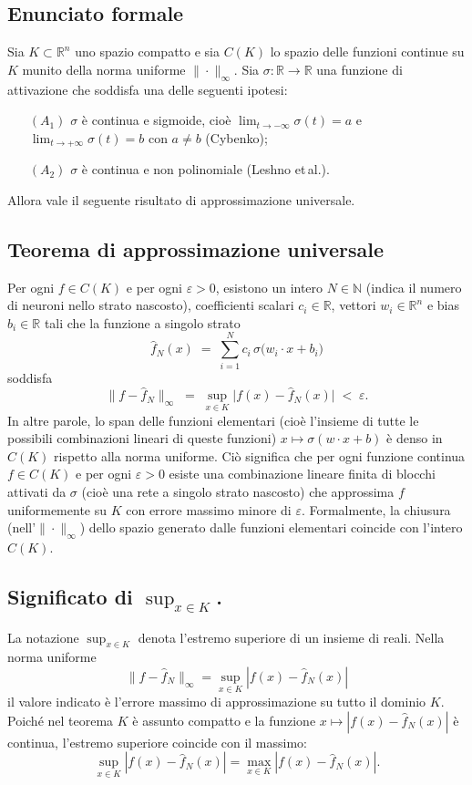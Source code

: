 \documentclass[a4paper,12pt]{report}
\begin{document}
	\subsection{Enunciato formale}
	Sia \(K\subset\mathbb{R}^n\) uno spazio compatto e sia \(C(K)\) lo spazio delle funzioni continue su \(K\) munito della norma uniforme \(\|\cdot\|_\infty\). Sia \(\sigma:\mathbb{R}\to\mathbb{R}\) una funzione di attivazione che soddisfa una delle seguenti ipotesi:
	
	\begin{enumerate}
		\item[\((A_1)\)] \(\sigma\) è continua e sigmoide, cioè \(\lim_{t\to -\infty}\sigma(t)=a\) e \(\lim_{t\to +\infty}\sigma(t)=b\) con \(a\neq b\) (Cybenko);
		\item[\((A_2)\)] \(\sigma\) è continua e non polinomiale (Leshno et\,al.). 
	\end{enumerate}
	
	Allora vale il seguente risultato di approssimazione universale.
	
	\subsection{Teorema di approssimazione universale}
	Per ogni \(f\in C(K)\) e per ogni \(\varepsilon>0\), esistono un intero \(N\in\mathbb{N}\) (indica il numero di neuroni nello strato nascosto), coefficienti scalari \(c_i\in\mathbb{R}\), vettori \(w_i\in\mathbb{R}^n\) e bias \(b_i\in\mathbb{R}\) tali che la funzione a singolo strato
	\[
	\hat f_N(x) \;=\; \sum_{i=1}^N c_i\,\sigma\bigl(w_i\cdot x + b_i\bigr)
	\]
	soddisfa
	\[
	\|f - \hat f_N\|_\infty \;=\; \sup_{x\in K} \bigl|f(x)-\hat f_N(x)\bigr| \;<\; \varepsilon.
	\]
	In altre parole, lo span delle funzioni elementari (cioè l'insieme di tutte le possibili combinazioni lineari di queste funzioni) \(x\mapsto\sigma(w\cdot x + b)\) è denso in \(C(K)\) rispetto alla norma uniforme. Ciò significa che per ogni funzione continua \(f\in C(K)\) e per ogni \(\varepsilon>0\) esiste una combinazione lineare finita di blocchi attivati da \(\sigma\) (cioè una rete a singolo strato nascosto) che approssima \(f\) uniformemente su \(K\) con errore massimo minore di \(\varepsilon\). Formalmente, la chiusura (nell'\(\|\cdot\|_\infty\)) dello spazio generato dalle funzioni elementari coincide con l'intero \(C(K)\).
	
	\subsection{Significato di \(\sup_{x\in K}\).}
	La notazione \(\sup_{x\in K}\) denota l'estremo superiore di un insieme di reali. Nella norma uniforme
	\[
	\|f-\hat f_N\|_\infty=\sup_{x\in K}|f(x)-\hat f_N(x)|
	\]
	il valore indicato è l'errore massimo di approssimazione su tutto il dominio \(K\). Poiché nel teorema \(K\) è assunto compatto e la funzione \(x\mapsto|f(x)-\hat f_N(x)|\) è continua, l'estremo superiore coincide con il massimo:
	\[
	\sup_{x\in K}|f(x)-\hat f_N(x)|=\max_{x\in K}|f(x)-\hat f_N(x)|.
	\]
	
\end{document}
